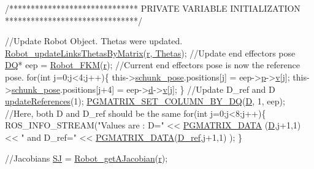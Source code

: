 \begin{DoxyCode}
        \textcolor{comment}{/******************************}
\textcolor{comment}{        PRIVATE VARIABLE INITIALIZATION}
\textcolor{comment}{        *******************************/}

        \textcolor{comment}{//Update Robot Object. Thetas were updated.}
        \hyperlink{robot_8h_aa1d3aca5132bd5f347f5966d38fbb966}{Robot\_updateLinksThetasByMatrix}(\hyperlink{classCartesian__controller_a5562129951bd802e4ded77fc716c87a0}{r},\hyperlink{classCartesian__controller_a0a0f818dad601cd9e3e26cb6959b8eb6}{
      Thetas});
        \textcolor{comment}{//Update end effectors pose}
        \hyperlink{structDQ}{DQ}* eep = \hyperlink{robot_8h_a57cc252fbb9e4c8be955b6af755b0c2c}{Robot\_FKM}(\hyperlink{classCartesian__controller_a5562129951bd802e4ded77fc716c87a0}{r});
        \textcolor{comment}{//Current end effectors pose is now the reference pose.}
        \textcolor{keywordflow}{for}(\textcolor{keywordtype}{int} j=0;j<4;j++)\{
                this->\hyperlink{classCartesian__pose__controller_a301bc44e901e4837cf036661478354c4}{schunk\_pose}.positions[j]   = eep->\hyperlink{structDQ_a878210bff170f4392d6cbe2d4704ffdc}{p}->\hyperlink{structQ_a2a0074b583999340d42804e4c1141ac4}{v}[j];
                this->\hyperlink{classCartesian__pose__controller_a301bc44e901e4837cf036661478354c4}{schunk\_pose}.positions[j+4] = eep->\hyperlink{structDQ_a535cdb52876521fd6abbfcf211a7c702}{d}->\hyperlink{structQ_a2a0074b583999340d42804e4c1141ac4}{v}[j];
        \}
        \textcolor{comment}{//Update D\_ref and D}
        \hyperlink{classCartesian__pose__controller_a965f86a383eb205df10832626fac98af}{updateReferences}(1);
        \hyperlink{dualquaternion_8h_a3d48348c3e25d1724058c2cf2364e42e}{PGMATRIX\_SET\_COLUMN\_BY\_DQ}(\hyperlink{classCartesian__controller_a8c470b652ce436d8e48f126073fc2593}{D}, 1, eep);
        \textcolor{comment}{//Here, both D and D\_ref should be the same}
        \textcolor{keywordflow}{for}(\textcolor{keywordtype}{int} j=0;j<8;j++)\{
                ROS\_INFO\_STREAM(\textcolor{stringliteral}{"Values are : D="} << \hyperlink{gmatrix_8h_a7333180c47234295df2bd7b09ac00da8}{PGMATRIX\_DATA}
      (\hyperlink{classCartesian__controller_a8c470b652ce436d8e48f126073fc2593}{D},j+1,1) << \textcolor{stringliteral}{" and D\_ref="} << \hyperlink{gmatrix_8h_a7333180c47234295df2bd7b09ac00da8}{PGMATRIX\_DATA}(\hyperlink{classCartesian__controller_abb248cb3215a574fe8e1bb8fb0b8626d}{D\_ref},j+1,1) );
        \}

        \textcolor{comment}{//Jacobians}
        \hyperlink{classCartesian__controller_a98fdac06d136ac3dba0102d97cd5dd36}{SJ}  = \hyperlink{robot_8h_ab6dd42296709cf38d3468af7afd29563}{Robot\_getAJacobian}(\hyperlink{classCartesian__controller_a5562129951bd802e4ded77fc716c87a0}{r});


\end{DoxyCode}
